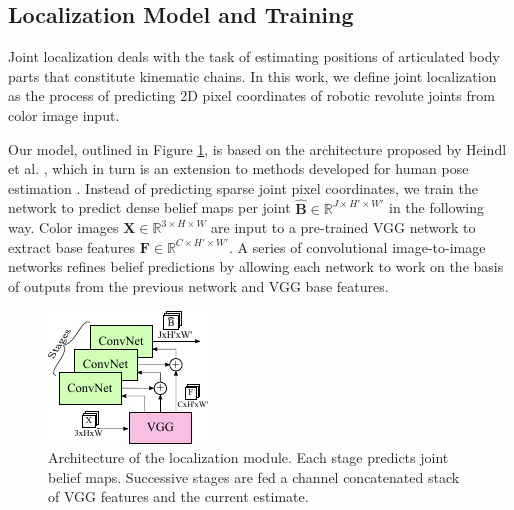 \documentclass[conference]{IEEEtran}
\begin{document}
\subsection{Localization Model and Training}
    \label{sec:model}

    Joint localization deals with the task of estimating positions of articulated body parts that constitute kinematic chains. In this work, we define joint localization as the process of predicting 2D pixel coordinates of robotic revolute joints from color image input. 
    
    Our model, outlined in Figure \ref{fig:jointmodel}, is based on the architecture proposed by Heindl et al. \cite{cheind2019disp}, which in turn is an extension to methods developed for human pose estimation \cite{cao2017realtime, newell2016stacked}. Instead of predicting sparse joint pixel coordinates, we train the network to predict dense belief maps per joint $\hat{\mathbf{B}} \in \mathbb{R}^{J \times H' \times W'}$ in the following way. Color images $\mathbf{X} \in \mathbb{R}^{3 \times H\times W}$ are input to a pre-trained VGG network \cite{simonyan2014very} to extract base features $\mathbf{F} \in \mathbb{R}^{C \times H' \times W'}$. A series of convolutional image-to-image networks refines belief predictions by allowing each network to work on the basis of outputs from the previous network and VGG base features.

    \begin{figure} [!h]
        \centering
        \includegraphics[width=0.7\columnwidth]{figures/joint_model/joint_model.pdf}
        \caption {
            \label{fig:jointmodel} 
            Architecture of the localization module. Each stage predicts joint belief maps. Successive stages are fed a channel concatenated stack of VGG features and the current estimate.
        }
    \end{figure}
\end{document}
